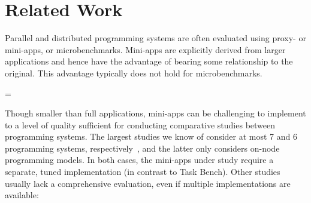 \section{Related Work}
\label{sec:related-work}

{}

Parallel and distributed programming systems are often
evaluated using proxy- or mini-apps, or
microbenchmarks. Mini-apps are explicitly derived from larger
applications and hence have the advantage of bearing some
relationship to the original. This advantage typically does not hold
for microbenchmarks.

\brokenpenalty=\oldbrokenpenalty

Though smaller than full applications, mini-apps can be challenging to
implement to a level of quality sufficient for conducting comparative
studies between programming systems. {\color{blue} The largest studies
we know of consider at most 7 and 6 programming systems,
respectively~\cite{LULESH13, Deakin19}, and the latter only considers
on-node programming models.} In both cases, the mini-apps under study
require a separate, tuned implementation (in contrast to Task
Bench). Other studies usually lack a comprehensive evaluation, even if
multiple implementations are available:



